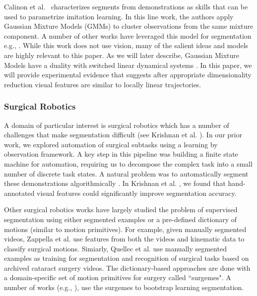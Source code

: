 Calinon et al.~\cite{calinon2014skills, calinon2014task, calinon2010learning}  characterizes segments from demonstrations as skills that can be used to parametrize imitation learning.
In this line work, the authors apply Gaussian Mixture Models (GMMs) to cluster observations from the same mixture component.
A number of other works have leveraged this model for segmentation e.g., \cite{konidaris2009efficient, konidaris2011robot, subramanian2011learning}.
While this work does not use vision, many of the salient ideas and models are highly relevant to this paper.
As we will later describe, Gaussian Mixture Models have a duality with switched linear dynamical systems \cite{moldovan2013dirichlet}.
In this paper, we will provide experimental evidence that suggests after appropriate dimensionality reduction visual features are similar to locally linear trajectories.

\subsubsection{Surgical Robotics}
A domain of particular interest is surgical robotics which has a number of challenges that make segmentation difficult 
(see Krishnan et al. \cite{krishnan2015tsc}).
In our prior work, we explored automation of surgical subtasks \cite{murali2015learning} using a learning by observation framework. 
A key step in this pipeline was building a finite state machine for automation, requiring us to decompose the complex task into a small number of discrete task states.
A natural problem was to automatically segment these demonstrations algorithmically \cite{krishnan2015tsc}.
In Krishnan et al. \cite{krishnan2015tsc}, we found that hand-annotated visual features could significantly improve segmentation accuracy.

Other surgical robotics works have largely studied the problem of supervised segmentation using either segmented examples or a pre-defined dictionary of motions (similar to motion primitives).
For example, given manually segmented videos, Zappella et al. \cite{zappella2013surgical} use features from both the videos and kinematic data to classify surgical motions.
Simiarly, Quellec et al. \cite{quellec2014segmentation} use manually segmented examples as training for segmentation and recognition of surgical tasks based on archived cataract surgery videos. 
The dictionary-based approaches are done with a domain-specific set of motion primitives for surgery called ``surgemes".
A number of works (e.g., \cite{lin2005automatic, varadarajan2009data,tao2013surgical,lea15improved}), use the surgemes to bootstrap learning segmentation.

